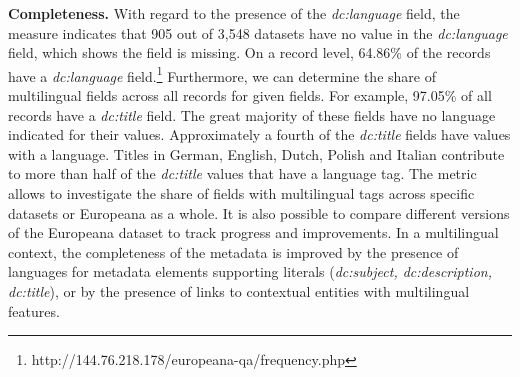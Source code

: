 \noindent\textbf{Completeness.}
With regard to the presence of the \textit{dc:language} field, the measure indicates that 905 out of 3,548 
datasets have no value in the \textit{dc:language} field, which shows the field is missing. On a record level, 64.86\% of the records have a \textit{dc:language} field.\footnote{ http://144.76.218.178/europeana-qa/frequency.php}
Furthermore, we can determine the share of multilingual fields across all records for given fields. For example, 97.05\% of all records have a \textit{dc:title} field. The great majority of these fields have no language indicated for their values. Approximately a fourth  of the \textit{dc:title} fields have values with a language. Titles in German, English, Dutch, Polish and Italian contribute to more than half of the \textit{dc:title} values that have a language tag. The metric allows to investigate the share of fields with multilingual tags across specific datasets or Europeana as a whole. It is also possible to compare different versions of the Europeana dataset to track progress and improvements.  
In a multilingual context, the completeness of the metadata is improved by the presence of languages for metadata elements supporting literals (\textit{dc:subject, dc:description, dc:title}), or by the presence of links to contextual entities with multilingual features.

